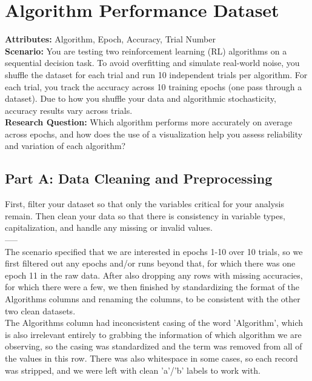 \section{Algorithm Performance Dataset}

{\bf Attributes:} Algorithm, Epoch, Accuracy, Trial Number\\

{\bf Scenario:} You are testing two reinforcement learning (RL) algorithms on a sequential decision task. To avoid overfitting and simulate real-world noise, you shuffle the dataset for each trial and run 10 independent trials per algorithm. For each trial, you track the accuracy across 10 training epochs (one pass through a dataset). Due to how you shuffle your data and algorithmic stochasticity, accuracy results vary across trials.\\

{\bf  Research Question:} Which algorithm performs more accurately on average across epochs, and how does the use of a visualization help you assess reliability and variation of each algorithm?

\subsection{Part A: Data Cleaning and Preprocessing}
First, filter your dataset so that only the variables critical for your analysis remain. Then clean your data so that there is consistency in variable types, capitalization, and handle any missing or invalid values.\\
-----\\
The scenario specified that we are interested in epochs 1-10 over 10 trials, so we first filtered out any epochs and/or runs beyond that, for which there was one epoch 11 in the raw data. After also dropping any rows with missing accuracies, for which there were a few, we then finished by standardizing the format of the Algorithms columns and renaming the columns, to be consistent with the other two clean datasets.\\

The Algorithms column had inconcsistent casing of the word 'Algorithm', which is also irrelevant entirely to grabbing the information of which algorithm we are observing, so the casing was standardized and the term was removed from all of the values in this row. There was also whitespace in some cases, so each record was stripped, and we were left with clean 'a'/'b' labels to work with.\\

